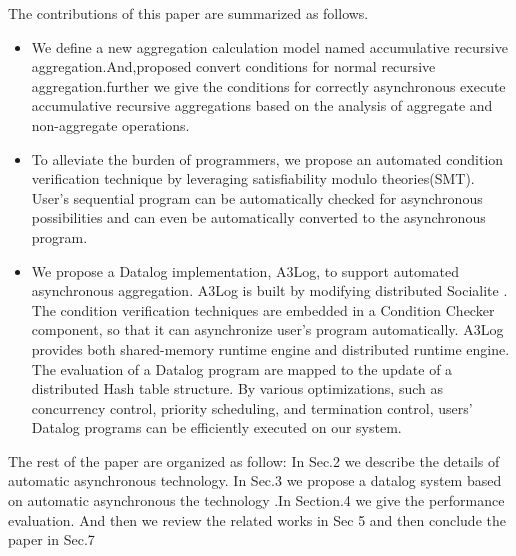 The contributions of this paper are summarized as follows.
\begin{itemize}
	\item We define a new aggregation calculation model named accumulative recursive aggregation.And,proposed convert conditions for normal recursive aggregation.further we give the conditions for correctly asynchronous execute accumulative recursive aggregations based on the analysis of aggregate and non-aggregate operations.  
	\item To alleviate the burden of programmers, we propose an automated condition verification technique by leveraging satisfiability modulo theories(SMT). User's sequential program can be automatically checked for asynchronous possibilities and can even be automatically converted to the asynchronous program.
	\item We propose a Datalog implementation, A3Log, to support automated asynchronous aggregation. A3Log is built by modifying distributed Socialite \cite{}. The condition verification techniques are embedded in a Condition Checker component, so that it can asynchronize user's program automatically.	 A3Log provides both shared-memory runtime engine and distributed runtime engine. The evaluation of a Datalog program are mapped to the update of a distributed Hash table structure. By various optimizations, such as concurrency control, priority scheduling, and termination control, users' Datalog programs can be efficiently executed on our system.
\end{itemize}

The rest of the paper are organized as follow: In Sec.2 we describe the details of  automatic asynchronous technology. In Sec.3 we propose a datalog system based on automatic asynchronous the technology .In Section.4  we give the performance evaluation. And then we review the related works in Sec 5 and then conclude the paper in Sec.7
